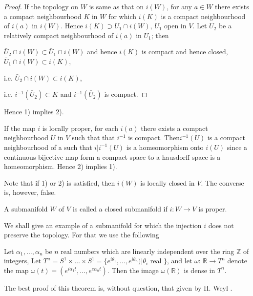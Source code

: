 \begin{proof}
  If the topology on $W$ is same as that on  $i(W)$, for any  $a \in
  W$ there exists a compact neighbourhood $K$ in $W$ for which $i(K)$
  is a compact neighbourhood of $i(a)$ in $i(W)$. Hence $i(K) \supset
  U_1 \cap i(W)$, $U_1$ open in $V$. Let $U_2$ be a relatively compact
  neighbourhood of $i(a)$ in $U_1$; then  
  
  $\bar{U}_2 \cap i (W) \subset \bar{U}_1 \cap i (W)$ and hence $i(K)$
  is compact and hence closed, $\bar{U}_1 \cap i (W) \subset i(K)$, 

  i.e. \quad $\bar{U}_2 \cap i (W) \subset i(K)$,

  i.e. \quad $i^{-1}(\bar{U}_2) \subset K$ and $i^{-1}(\bar{U}_2)$ is compact. 
\end{proof} 
 
\noindent
Hence 1) implies  2).
 
If the map $i$ is locally proper, for each $i(a)$ there exists a
compact neighbourhood $U$ in $V$ such that that $i^{-1}$ is
compact. Then\pageoriginale $i^{-1} (U)$ is a compact neighbourhood of a such that
$i \Big| i^{-1} (U)$ is a homeomorphism onto $i(U)$ since a continuous
bijective map form a compact space to a hausdorff space is a
homeomorphism. Hence 2) implies 1).  

Note that if 1) or 2) is satisfied, then $i(W)$ is locally closed in
$V$. The converse is, however, false. 

\begin{defi*}
  A submanifold $W$ of $V$ is called a closed submanifold if $i: W
  \to V$ is proper. 
\end{defi*}

We shall give an example of a submanifold for which the injection $i$
does not preserve the topology. For that we use the following 
\begin{theorem*}[(Kronecker)]
  Let $\alpha_1 ,\ldots , \alpha_n$ be $n$ real numbers which are
  linearly independent over the ring $\mathbb{Z}$ of integers, Let $T^n
  = S^1 \times \dots \times S^1 = \big \{ e^{i \theta_1}, \ldots ,
  e^{i \theta_n} )  | \theta_i$ real $\big \}$, and let $\omega$:
  $\mathbb{R} \to T^n$ denote the map $\omega (t) = (e^{i \alpha_1 t},
  \ldots , e^{e \alpha_n t})$. Then the image $\omega (\mathbb{R})$ is
  dense in  $T^n$. 
\end{theorem*}

The best proof of this theorem is, without question, that given by
H. Weyl \cite{44}. 

